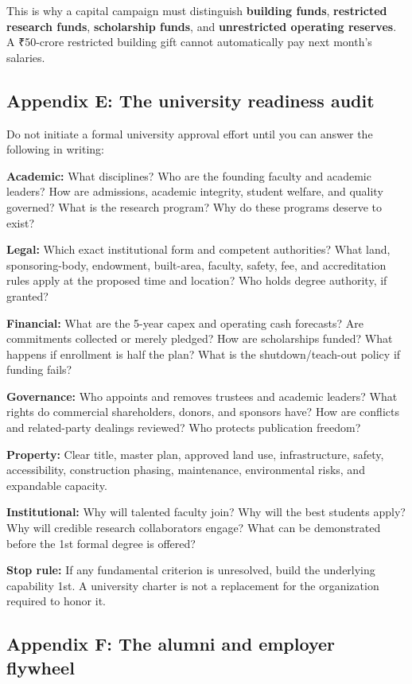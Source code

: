 This is why a capital campaign must distinguish \textbf{building funds}, \textbf{restricted research funds}, \textbf{scholarship funds}, and \textbf{unrestricted operating reserves}. A \textnormal{₹}50-crore restricted building gift cannot automatically pay next month's salaries.

\subsection{Appendix E: The university readiness audit}

Do not initiate a formal university approval effort until you can answer the following in writing:

\textbf{Academic:} What disciplines? Who are the founding faculty and academic leaders? How are admissions, academic integrity, student welfare, and quality governed? What is the research program? Why do these programs deserve to exist?

\textbf{Legal:} Which exact institutional form and competent authorities? What land, sponsoring-body, endowment, built-area, faculty, safety, fee, and accreditation rules apply at the proposed time and location? Who holds degree authority, if granted?

\textbf{Financial:} What are the 5-year capex and operating cash forecasts? Are commitments collected or merely pledged? How are scholarships funded? What happens if enrollment is half the plan? What is the shutdown/\allowbreak teach-out policy if funding fails?

\textbf{Governance:} Who appoints and removes trustees and academic leaders? What rights do commercial shareholders, donors, and sponsors have? How are conflicts and related-party dealings reviewed? Who protects publication freedom?

\textbf{Property:} Clear title, master plan, approved land use, infrastructure, safety, accessibility, construction phasing, maintenance, environmental risks, and expandable capacity.

\textbf{Institutional:} Why will talented faculty join? Why will the best students apply? Why will credible research collaborators engage? What can be demonstrated before the 1st formal degree is offered?

\textbf{Stop rule:} If any fundamental criterion is unresolved, build the underlying capability 1st. A university charter is not a replacement for the organization required to honor it.

\subsection{Appendix F: The alumni and employer flywheel}

